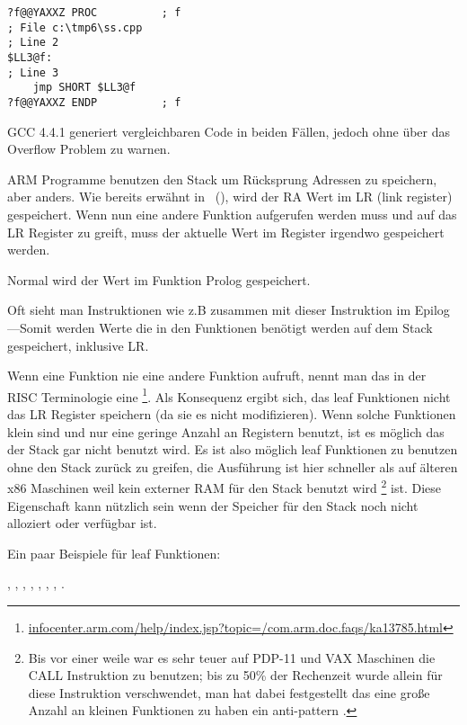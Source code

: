 \begin{lstlisting}[style=customasmx86]
?f@@YAXXZ PROC			; f
; File c:\tmp6\ss.cpp
; Line 2
$LL3@f:
; Line 3
	jmp	SHORT $LL3@f
?f@@YAXXZ ENDP			; f
\end{lstlisting}


GCC 4.4.1 generiert vergleichbaren Code in beiden Fällen, jedoch ohne über das Overflow Problem zu warnen.




ARM Programme benutzen den Stack um Rücksprung Adressen zu speichern, aber anders.
Wie bereits erwähnt in \q{\HelloWorldSectionName}~(),
wird der \ac{RA} Wert im \ac{LR} (\gls{link register}) gespeichert.
Wenn nun eine andere Funktion aufgerufen werden muss und auf das \ac{LR} Register 
zu greift, muss der aktuelle Wert im Register irgendwo gespeichert werden.

Normal wird der Wert im Funktion Prolog gespeichert.


Oft sieht man Instruktionen wie z.B  zusammen mit dieser Instruktion im 
Epilog ---Somit werden Werte die in den Funktionen benötigt werden auf dem 
Stack gespeichert, inklusive \ac{LR}.

Wenn eine Funktion nie eine andere Funktion aufruft, nennt man das in der \ac{RISC} Terminologie eine
\footnote{\href{http://go.yurichev.com/17064}{infocenter.arm.com/help/index.jsp?topic=/com.arm.doc.faqs/ka13785.html}}.  %
Als Konsequenz ergibt sich, das leaf Funktionen nicht das \ac{LR} Register speichern (da sie es nicht modifizieren).
Wenn solche Funktionen klein sind und nur eine geringe Anzahl an Registern benutzt, ist es möglich das der Stack
gar nicht benutzt wird. Es ist also möglich leaf Funktionen zu benutzen ohne den Stack zurück zu greifen, die Ausführung
ist hier schneller als auf älteren x86 Maschinen weil kein externer RAM für den Stack benutzt wird 
\footnote{Bis vor einer weile war es sehr teuer auf PDP-11 und VAX Maschinen die CALL Instruktion zu benutzen; bis zu 50\%
der Rechenzeit wurde allein für diese Instruktion verschwendet, man hat dabei festgestellt das eine große Anzahl an kleinen
Funktionen zu haben ein \gls{anti-pattern} .} ist.
Diese Eigenschaft kann nützlich sein wenn der Speicher für den Stack noch nicht alloziert oder verfügbar ist.

Ein paar Beispiele für leaf Funktionen:

, , 
, , ,
, , .

